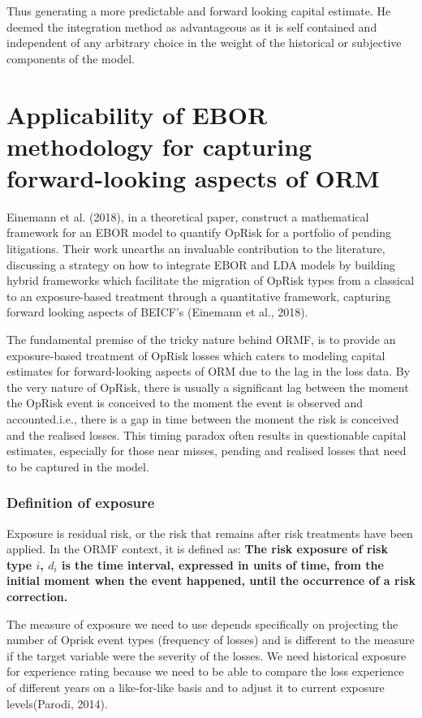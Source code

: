 \documentclass[]{DissertateUSU}
\begin{document}
Thus generating a more predictable and forward looking capital estimate.
He deemed the integration method as advantageous as it is self contained
and independent of any arbitrary choice in the weight of the historical
or subjective components of the model.

\section{Applicability of EBOR methodology for capturing forward-looking aspects of ORM}
\label{sec:Applicability of EBOR methodology for capturing forward-looking aspects of ORM}

Einemann et al. (2018), in a theoretical paper, construct a mathematical
framework for an EBOR model to quantify OpRisk for a portfolio of
pending litigations. Their work unearths an invaluable contribution to
the literature, discussing a strategy on how to integrate EBOR and LDA
models by building hybrid frameworks which facilitate the migration of
OpRisk types from a classical to an exposure-based treatment through a
quantitative framework, capturing forward looking aspects of BEICF's
(Einemann et al., 2018).

The fundamental premise of the tricky nature behind ORMF, is to provide
an exposure-based treatment of OpRisk losses which caters to modeling
capital estimates for forward-looking aspects of ORM due to the lag in
the loss data. By the very nature of OpRisk, there is usually a
significant lag between the moment the OpRisk event is conceived to the
moment the event is observed and accounted.i.e., there is a gap in time
between the moment the risk is conceived and the realised losses. This
timing paradox often results in questionable capital estimates,
especially for those near misses, pending and realised losses that need
to be captured in the model.\medskip

\subsubsection{Definition of exposure}

Exposure is residual risk, or the risk that remains after risk
treatments have been applied. In the ORMF context, it is defined as:
\textbf{The risk exposure of risk type $i$, $d_{i}$ is the time interval, expressed in units of time, from the initial moment when the event happened, until the occurrence of a risk correction.}

The measure of exposure we need to use depends specifically on
projecting the number of Oprisk event types (frequency of losses) and is
different to the measure if the target variable were the severity of the
losses. We need historical exposure for experience rating because we
need to be able to compare the loss experience of different years on a
like-for-like basis and to adjust it to current exposure levels(Parodi,
2014).
\end{document}
